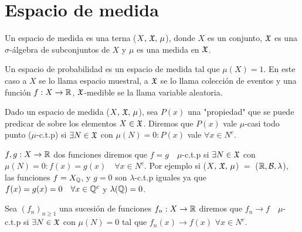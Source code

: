 \section{Espacio de medida}

\begin{definition}
    Un espacio de medida es una terna (\(X\text{, } \mathfrak{X}\text{, } \mu\)), donde \(X\) es un conjunto, \(\mathfrak{X}\) es una \(\sigma\)-álgebra de subconjuntos de \(X\) y \(\mu\) es una medida en \(\mathfrak{X}\).
\end{definition}

Un espacio de probabilidad es un espacio de medida tal que \(\mu(X) = 1\).
En este caso a \(X\) se lo llama espacio muestral, a \(\mathfrak{X}\) se lo llama colección de eventos y
una función \(f: X \to \mathbb{R}\), \(\mathfrak{X}\)-medible se la llama variable aleatoria.

\begin{definition}
    Dado un espacio de medida (\(X\text{, } \mathfrak{X}\text{, } \mu\)), sea \(P(x)\) una "propiedad" que se puede predicar de sobre los elementos \(X \in \mathfrak{X}\).
    Diremos que \(P(x)\) vale \(\mu\)-casi todo punto (\(\mu\)-c.t.p) si \(\exists N \in \mathfrak{X}\) con \(\mu(N) = 0 : P(x)\) vale \(\forall x \in N^c\).
\end{definition}

\begin{eg}
    \(f, g : X \to \mathbb{R}\) dos funciones diremos que \(f = g \quad \mu\)-c.t.p si \(\exists N \in \mathfrak{X}\) con \(\mu(N) = 0 : f(x) = g(x) \quad \forall x \in N^c\).
    Por ejemplo si (\(X\text{, } \mathfrak{X}\text{, } \mu\)) \(=\) (\(\mathbb{R}, \mathcal{B}, \lambda \)), las funciones \(f = X_{\mathbb{Q}}\), y \(g = 0\) son \(\lambda\)-c.t.p iguales ya que
    \(f(x) = g(x) = 0 \quad \forall x \in \mathbb{Q}^c\) y \(\lambda(\mathbb{Q}) = 0\).
\end{eg}

\begin{eg}
    Sea \((f_n)_{n \geq 1}\) una sucesión de funciones \(f_n : X \to \mathbb{R}\) diremos que \(f_n \to f \quad \mu\)-c.t.p si \(\exists N \in \mathfrak{X}\) con \(\mu(N) = 0\) tal que
    \(f_n(x) \to f(x)\) \(\forall x \in N^c\).
\end{eg}

